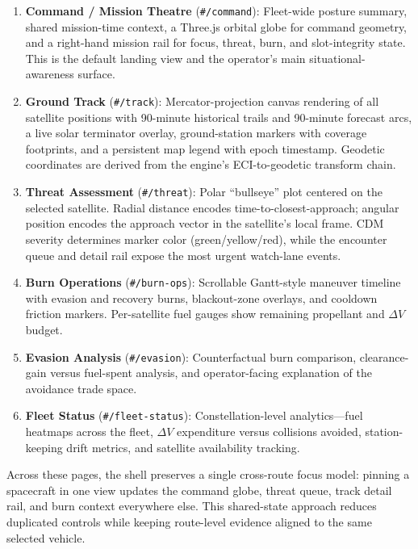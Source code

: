 \documentclass[10pt,twocolumn,letterpaper]{article}
\begin{document}
\begin{enumerate}[nosep,leftmargin=*]
  \item \textbf{Command / Mission Theatre} (\texttt{\#/command}):
    Fleet-wide posture summary, shared mission-time context, a Three.js
    orbital globe for command geometry, and a right-hand mission rail for
    focus, threat, burn, and slot-integrity state.  This is the default
    landing view and the operator's main situational-awareness surface.

  \item \textbf{Ground Track} (\texttt{\#/track}):
    Mercator-projection canvas rendering of all satellite positions with
    90-minute historical trails and 90-minute forecast arcs, a live
    solar terminator overlay, ground-station markers with coverage
    footprints, and a persistent map legend with epoch timestamp.
    Geodetic coordinates are derived from the engine's ECI-to-geodetic
    transform chain.

  \item \textbf{Threat Assessment} (\texttt{\#/threat}):
    Polar ``bullseye'' plot centered on the selected satellite.  Radial
    distance encodes time-to-closest-approach; angular position encodes
    the approach vector in the satellite's local frame.  CDM severity
    determines marker color (green/yellow/red), while the encounter queue
    and detail rail expose the most urgent watch-lane events.

  \item \textbf{Burn Operations} (\texttt{\#/burn-ops}):
    Scrollable Gantt-style maneuver timeline with evasion and recovery
    burns, blackout-zone overlays, and cooldown friction markers.
    Per-satellite fuel gauges show remaining propellant and $\Delta V$
    budget.

  \item \textbf{Evasion Analysis} (\texttt{\#/evasion}):
    Counterfactual burn comparison, clearance-gain versus fuel-spent
    analysis, and operator-facing explanation of the avoidance trade space.

  \item \textbf{Fleet Status} (\texttt{\#/fleet-status}):
    Constellation-level analytics---fuel heatmaps across the fleet,
    $\Delta V$ expenditure versus collisions avoided, station-keeping
    drift metrics, and satellite availability tracking.
\end{enumerate}

Across these pages, the shell preserves a single cross-route focus model:
pinning a spacecraft in one view updates the command globe, threat queue,
track detail rail, and burn context everywhere else.  This shared-state
approach reduces duplicated controls while keeping route-level evidence
aligned to the same selected vehicle.
\end{document}
